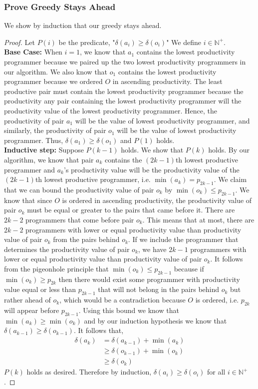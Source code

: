 \documentclass[11pt]{scrartcl}
\begin{document}
	\subsubsection{
		Prove Greedy Stays Ahead
	}
	We show by induction that our greedy stays ahead.
	\begin{proof}
		Let $P(i)$ be the predicate, "$\delta(a_i) \geq \delta(o_i)$"
		We define $i \in \mathbb{N}^+$. \\
		\textbf{Base Case:} When $i = 1$, we know that $a_1$ contains the lowest productivity programmer
		because we paired up the two lowest productivity programmers in our algorithm. We also know that
		$o_1$ contains the lowest productivity programmer because we ordered $O$ in ascending productivity.
		The least productive pair must contain the lowest productivity programmer because the
		productivity any pair containing the lowest productivity programmer will the productivity value of the
		lowest productivity programmer.
		Hence, the productivity of pair $a_1$ will be the value of lowest productivity programmer, and
		similarly, the productivity of pair $o_1$ will be the value of lowest productivity programmer.
		Thus, $\delta(a_1) \geq \delta(o_1)$ and $P(1)$ holds.\\
		\textbf{Inductive step:} Suppose $P(k-1)$ holds. We show that $P(k)$ holds.
		By our algorithm, we know that pair $a_k$ contains the $(2k-1)$th lowest productive
		programmer and $a_k$'s productivity value will be the productivity value of the
		$(2k-1)$th lowest productive programmer, i.e. $\min(a_k) = p_{2k-1}$.
		We claim that we can bound the productivity value of pair $o_k$ by
		$\min(o_k) \leq p_{2k-1}$. We know that since $O$ is ordered
		in ascending productivity, the productivity value of pair $o_k$ must be equal or greater
		to the pairs that came before it. There are $2k-2$ programmers that come before pair
		$o_k$. This means that at most, there are $2k-2$ programmers with lower or equal productivity value
		than productivity value of pair $o_k$ from the pairs behind $o_k$.
		If we include the programmer that determines the productivity value of pair $o_k$,
		we have $2k-1$ programmers with lower or equal productivity value
		than productivity value of pair $o_k$. It follows from the pigeonhole principle
		that $\min(o_k) \leq p_{2k-1}$ because if $\min(o_k) \geq p_{2k}$ then
		there would exist some programmer with productivity value equal or
		less than $p_{2k-1}$ that will not belong in the pairs behind $o_k$ but
		rather ahead of $o_k$, which would be a contradiction because $O$ is
		ordered, i.e. $p_{2k}$ will appear before $p_{2k-1}$.
		Using this bound we know that $\min(a_k)\geq \min(o_k)$ and by our induction
		hypothesis we know that $\delta(a_{k-1}) \geq \delta(o_{k-1})$. It follows that,
		\begin{align*}
			\delta(a_k) & = \delta(a_{k-1}) + \min(a_k)    \\
			            & \geq \delta(o_{k-1}) + \min(o_k) \\
			            & \geq \delta(o_k)
		\end{align*}
		$P(k)$ holds as desired. Therefore by induction, $\delta(a_i) \geq \delta(o_i)$ for all $i \in \mathbb{N}^+$.
	\end{proof}
\end{document}
